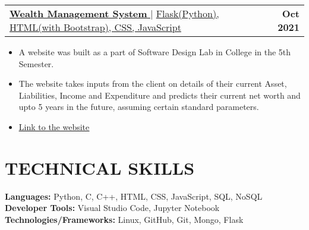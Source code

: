 \documentclass[letterpaper,11pt]{article}
\makeatletter
\newcommand{\resumeItem}[1]{
  \item\small{
    {#1 \vspace{-2pt}}
  }
}
\newcommand{\resumeSubheading}[4]{
  \vspace{-2pt}\item
    \begin{tabular*}{1.0\textwidth}[t]{l@{\extracolsep{\fill}}r}
      \textbf{\large#1} & \textbf{\small #2} \\
      \textit{\large#3} & \textit{\small #4} \\
      
    \end{tabular*}\vspace{-7pt}
}
\newcommand{\resumeProjectHeading}[2]{
    \item
    \begin{tabular*}{1.001\textwidth}{l@{\extracolsep{\fill}}r}
      \small#1 & \textbf{\small #2}\\
    \end{tabular*}\vspace{-7pt}
}
\newcommand{\resumeSubHeadingListStart}{\begin{itemize}[leftmargin=0.0in, label={}]}
\newcommand{\resumeSubHeadingListEnd}{\end{itemize}}
\newcommand{\resumeItemListStart}{\begin{itemize}}
\newcommand{\resumeItemListEnd}{\end{itemize}\vspace{-5pt}}
\makeatother
\begin{document}
      \resumeProjectHeading
          {\href{https://github.com/Sh0702/worth-it}{\textbf{\large{\underline{Wealth Management System}}} \href{Project Link}{\raisebox{-0.1\height}\faExternalLink }} $|$ \large{\underline{Flask(Python), HTML(with Bootstrap), CSS, JavaScript}}}{Oct 2021}
          \resumeItemListStart
            \resumeItem{\normalsize{A website was built as a part of Software Design Lab in College in the 5th Semester.}}
            \resumeItem{\normalsize{The website takes inputs from the client on details of their current Asset, Liabilities, Income and Expenditure and predicts their current net worth and upto 5 years in the future, assuming certain standard parameters.}}
            \resumeItem{\textcolor{accent} {\href{https://worth-it2021.herokuapp.com/} {\underline{\normalsize{Link to the website}}}}}
          \resumeItemListEnd
          \vspace{-13pt}
          
            
          
\vspace{-0.1pt}
%



  
\section{TECHNICAL SKILLS}
 \begin{itemize}[leftmargin=0.15in, label={}]
    \small{\item{
     \textbf{\normalsize{Languages:}}{ \normalsize{Python, C, C++, HTML, CSS, JavaScript, SQL, NoSQL}} \\
     \textbf{\normalsize{Developer Tools:}}{ \normalsize{Visual Studio Code, Jupyter Notebook}} \\
     \textbf{\normalsize{Technologies/Frameworks:}}{\normalsize{ Linux, GitHub, Git, Mongo, Flask}} \\
    }}
 \end{itemize}
 \vspace{-15pt}
\end{document}
